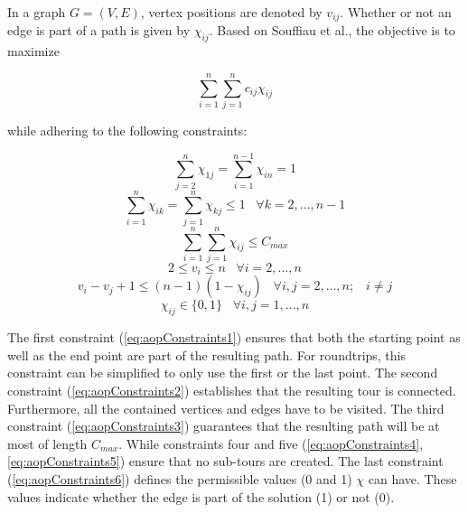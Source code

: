 In a graph $G=(V,E)$, vertex positions are denoted by $v_{ij}$.
Whether or not an edge is part of a path is given by $\chi_{ij}$.
Based on Souffiau et al., the objective is to maximize 

\begin{equation}
	\label{eq:aopMaximize}
	\sum_{i=1}^{n} \sum_{j=1}^{n} c_{ij} \chi_{ij}
\end{equation}

while adhering to the following constraints:


\begin{equation}
	\label{eq:aopConstraints1}
	\sum_{j=2}^{n} \chi_{1j} = \sum_{i=1}^{n-1} \chi_{in} = 1
\end{equation}
\begin{equation}
	\label{eq:aopConstraints2}
	\sum_{i=1}^{n} \chi_{ik} =  \sum_{j=1}^{n} \chi_{kj} \leq 1 \;\;\; \forall k = 2,...,n-1
\end{equation}
\begin{equation}
	\label{eq:aopConstraints3}
	\sum_{i=1}^{n}  \sum_{j=1}^{n} \chi_{ij} \leq C_{max}
\end{equation}
\begin{equation}
	\label{eq:aopConstraints4}
	2 \leq v_i \leq n \;\;\; \forall i = 2,...,n
\end{equation}
\begin{equation}
	\label{eq:aopConstraints5}
	v_i - v_j + 1 \leq (n-1)(1-\chi_{ij}) \;\;\; \forall i,j = 2,...,n; \;\;\; i \neq j
\end{equation}
\begin{equation}
	\label{eq:aopConstraints6}
	\chi_{ij} \in \{0,1\} \;\;\; \forall i,j=1,...,n
\end{equation}


The first constraint (\ref{eq:aopConstraints1}) ensures that both the starting point as well as the end point are part of the resulting path.
For roundtrips, this constraint can be simplified to only use the first or the last point.
The second constraint (\ref{eq:aopConstraints2}) establishes that the resulting tour is connected.
Furthermore, all the contained vertices and edges have to be visited.
The third constraint (\ref{eq:aopConstraints3}) guarantees that the resulting path will be at most of length $C_{max}$.
While constraints four and five (\ref{eq:aopConstraints4}, \ref{eq:aopConstraints5}) ensure that no sub-tours are created.
The last constraint (\ref{eq:aopConstraints6}) defines the permissible values (0 and 1) $\chi$ can have.
These values indicate whether the edge is part of the solution (1) or not (0). 


